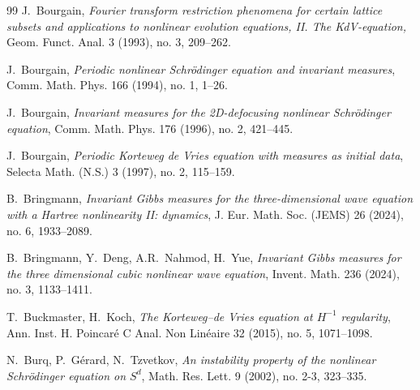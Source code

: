 \documentclass[letterpaper, 11pt,  reqno]{amsart}
\newcommand{\1}{\hspace{0.5mm}\text{I}\hspace{0.5mm}}
\numberwithin{equation}{section}
\numberwithin{theorem}{section}
\begin{document}
\begin{thebibliography}{99}
J.~Bourgain, 
{\it Fourier transform restriction phenomena for certain lattice subsets and applications to nonlinear evolution equations, II. The KdV-equation,} 
 Geom. Funct. Anal. 3 (1993), no. 3, 209--262.


J.~Bourgain,
{\it Periodic nonlinear Schr\"odinger equation and invariant measures},
Comm. Math. Phys. 166 (1994), no. 1, 1--26.


%
%
%


J.~Bourgain,
{\it Invariant measures for the 2D-defocusing nonlinear Schr\"odinger equation},
Comm. Math. Phys. 176 (1996), no. 2, 421--445.

%
J.~Bourgain, 
{\it Periodic Korteweg de Vries equation with measures as initial data}, 
 Selecta Math. (N.S.) 3 (1997), no. 2, 115--159.
%

%
%
%



B.~Bringmann, 
{\it Invariant Gibbs measures for the three-dimensional wave equation with a Hartree nonlinearity II: dynamics},
 J. Eur. Math. Soc. (JEMS) 26 (2024), no. 6, 1933--2089. 







B.~Bringmann, Y.~Deng, A.R.~Nahmod, H.~Yue, 
{\it Invariant Gibbs measures for the three dimensional cubic nonlinear wave equation},
 Invent. Math. 236 (2024), no. 3, 1133--1411. 

%
%


T.~Buckmaster, H.~Koch, 
{\it  The Korteweg--de Vries equation at $H^{-1}$ regularity},
Ann. Inst. H. Poincar\'e C Anal. Non Lin\'eaire 32 (2015), no. 5, 1071--1098.


N.~Burq, P.~G\'erard, N.~Tzvetkov,
{\it  An instability property of the nonlinear Schr\"odinger equation on $S^d$},  Math. Res. Lett. 9 (2002), no. 2-3, 323--335.


\end{thebibliography}
\end{document}
